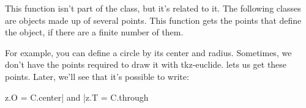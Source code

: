 This function isn't part of the  class, but it's related to it. The following classes are objects made up of several points. This function gets the points that define the object, if there are a finite number of them.

For example, you can define a circle by its center and radius. Sometimes, we don't have the points required to draw it with tkz-euclide.  lets us get these points. Later, we'll see that it's possible to write:

\begin{mybox}
  \begin{SVerbatim}
    z.O = C.center| and |z.T = C.through
\end{SVerbatim}
 \end{mybox}


\begin{tkzexample}[latex=7cm]
\end{tkzexample}





\endinput